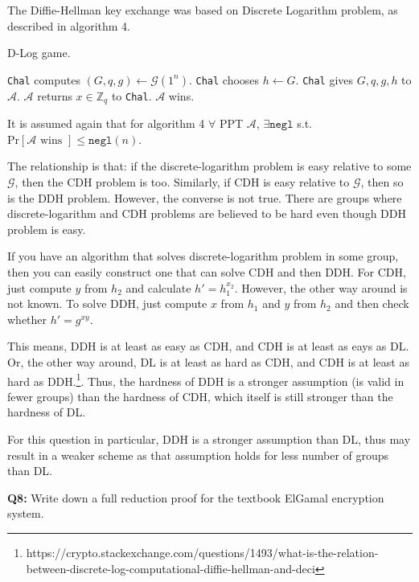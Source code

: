 \documentclass[12pt,reqno]{amsart}
\newcommand{\code}[1]{\texttt{#1}}
\newcommand{\advrs}[0]{\mathcal{A}}
\begin{document}
The Diffie-Hellman key exchange was based on Discrete Logarithm problem, as described in algorithm 4.
\begin{algorithm}
\caption{D-Log game.}
\label{alg:4}
\begin{algorithmic}
\STATE \code{Chal} computes $(G, q, g) \gets \mathcal{G}(1^n)$.
\STATE \code{Chal} chooses $h \gets G$.
\STATE \code{Chal} gives $G, q, g, h$ to $\advrs$.
\STATE $\advrs$ returns $x \in \mathbb{Z}_q$ to \code{Chal}.
	\STATE $\advrs$ wins.
\ENDIF
\end{algorithmic}
\end{algorithm}
It is assumed again that for algorithm 4 $\forall$ PPT $\advrs$, $\exists \code{negl}$ s.t. $\textrm{Pr}[\advrs \textrm{ wins }]\leq \code{negl}(n)$.

The relationship is that: if the discrete-logarithm problem is easy relative to some $\mathcal{G}$, then the CDH problem is too. Similarly, if CDH is easy relative to $\mathcal{G}$, then so is the DDH problem. However, the converse is not true. There are groups where discrete-logarithm and CDH problems are believed to be hard even though DDH problem is easy.

If you have an algorithm that solves discrete-logarithm problem in some group, then you can easily construct one that can solve CDH and then DDH. For CDH, just compute $y$ from $h_2$ and calculate $h'=h_1^{x_2}$. However, the other way around is not known. To solve DDH, just compute $x$ from $h_1$ and $y$ from $h_2$ and then check whether $h'=g^{xy}$.

This means, DDH is at least as easy as CDH, and CDH is at least as eays as DL. Or, the other way around, DL is at least as hard as CDH, and CDH is at least as hard as DDH.\footnote{https://crypto.stackexchange.com/questions/1493/what-is-the-relation-between-discrete-log-computational-diffie-hellman-and-deci}. Thus, the hardness of DDH is a stronger assumption (is valid in fewer groups) than the hardness of CDH, which itself is still stronger than the hardness of DL.

For this question in particular, DDH is a stronger assumption than DL, thus may result in a weaker scheme as that assumption holds for less number of groups than DL.

\vspace{20px}
\textbf{Q8:} Write down a full reduction proof for the textbook ElGamal encryption system.
\end{document}
